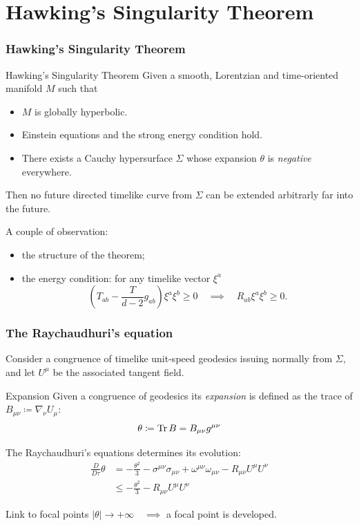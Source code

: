 \documentclass[]{beamer}
\begin{document}
\section{Hawking's Singularity Theorem}
\begin{frame}
	\frametitle{Hawking's Singularity Theorem}
	\begin{theoblock}{Hawking's Singularity Theorem \cite{wald2010general}}
		Given a smooth, Lorentzian and time-oriented manifold \(M\) such that 
		\begin{itemize}
			\item \(M\) is globally hyperbolic.
			\item Einstein equations and the strong energy condition hold.
			\item There exists a Cauchy hypersurface \(\Sigma\) whose expansion \(\theta\) is \emph{negative} everywhere.
		\end{itemize}
	Then no future directed timelike curve from \(\Sigma\) can be extended arbitrarly far into the future.
	\end{theoblock}

	\pause
	A couple of observation:
	\begin{itemize}
		\item<2-> the structure of the theorem;
		\item<3-> the energy condition: for any timelike vector \(\xi^a\) 
		{\small
			\[
		\left(T_{ab} - \frac{T}{d - 2}g_{ab}\right) \xi^a \xi^b \ge 0 \quad \implies \quad R_{ab} \xi^a \xi^b \ge 0.
		\]}
	\end{itemize}

\end{frame}
\begin{frame}
	\frametitle{The Raychaudhuri's equation}
	Consider a congruence of timelike unit-speed geodesics issuing normally from \(\Sigma\), and let \(U^{\mu}\) be the associated tangent field.
	\begin{defblock}{Expansion}
		Given a congruence of geodesics its \emph{expansion} is defined as the trace of \(B_{\mu\nu} \coloneqq \nabla_{\nu}U_{\mu}\):
		\[
		\theta \coloneqq \operatorname{Tr} B = B_{\mu\nu}g^{\mu\nu}
		\]
	\end{defblock}
\pause
The Raychaudhuri's equations determines its evolution:
{\small
\begin{align*}
	\frac{D}{D\tau} \theta &= -\frac{\theta^2}{3} -\sigma^{\mu\nu}\sigma_{\mu\nu} + \omega^{\mu\nu}\omega_{\mu\nu} - R_{\mu\nu}U^{\mu}U^{\nu} \\
	&\le -\frac{\theta^2}{3} - R_{\mu\nu}U^{\mu}U^{\nu}
\end{align*}}
\vskip -14pt
\pause
\begin{ideablock}{Link to focal points}
	\centering
	\(|\theta| \rightarrow +\infty\quad \implies\) a focal point is developed.
\end{ideablock}
\end{frame}
\end{document}

